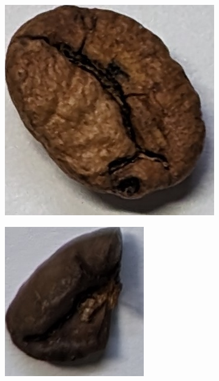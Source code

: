 \begin{figure}[h]
\begin{subfigure}
    \end{subfigure}
    \begin{subfigure}
    {0.2\textwidth}
        \includegraphics[height=0.8\linewidth, keepaspectratio]{
            ./figures/methodology/insect-damaged-bean
        }
         \label{fig:insectBeanSingle}
    \end{subfigure}
    \begin{subfigure}
    {0.2\textwidth}
        \includegraphics[height=0.8\linewidth, keepaspectratio]{
            ./figures/methodology/bean-fragment
}
\end{subfigure}
\end{figure}
